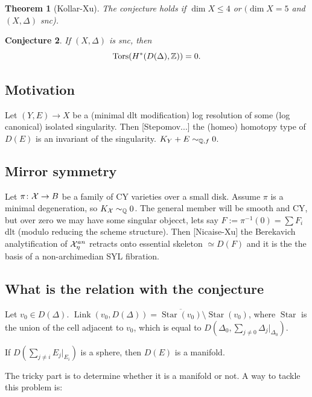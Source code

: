 \documentclass[A4paper, british, reqno]{amsart}
\theoremstyle{darkgreentheorem}
\newtheorem{thm}{Theorem}[section]
\newtheorem{conj}[thm]{Conjecture}
\theoremstyle{darkbluedefinition}
\theoremstyle{darkredexample}
\theoremstyle{remark}
\newcommand{\1}{\mathbbm{1}}
\begin{document}
\begin{thm}[Kollar-Xu]
    The conjecture holds if $\dim{X}\leqslant 4$ or $(\dim{X}=5$ and $(X,\Delta)$ snc).
\end{thm}

\begin{conj}
    If $(X,\Delta)$ is snc, then
    \[ \operatorname{Tors}(H^{*}(D(\Delta),\mathbb{Z}))=0. \]
\end{conj}

\subsection{Motivation}
Let $(Y,E)\to X$ be a (minimal dlt modification) log resolution of some (log canonical) isolated singularity.
Then [Stepomov...] the (homeo) homotopy type of $D(E)$ is an invariant of the singularity.
$K_{Y}+E\sim_{\mathbb{Q},f} 0 $.

\subsection{Mirror symmetry}
Let $\pi\colon \mathcal{X}\to B$ be a family of CY varieties over a small disk.
Assume $\pi$ is a minimal degeneration, so $K_{\mathcal{X}}\sim_{\mathbb{Q}} 0$.
The general member will be smooth and CY, but over zero we may have some singular objecct, lets say $F:=\pi^{-1}(0)=\sum F_{i}$ dlt (modulo reducing the scheme structure).
Then [Nicaise-Xu] the Berekavich analytification of $\mathcal{X}_{\eta}^{an}$ retracts onto essential skeleton $\simeq D(F)$ and it is the the basis of a non-archimedian SYL fibration.

\subsection{What is the relation with the conjecture}
Let $v_{0}\in D(\Delta)$.
$\operatorname{Link}(v_{0},D(\Delta))=\overline{\operatorname{Star}(v_{0})}\setminus \operatorname{Star}(v_{0})$, where $\operatorname{Star}$ is the union of the cell adjacent to $v_{0}$, which is equal to $D(\Delta_{0},\sum_{j\neq 0}\Delta_{j}|_{\Delta_{0}})$.

If $D(\sum_{j\neq i}E_{j}|_{E_{i}})$ is a sphere, then $D(E)$ is a manifold.

The tricky part is to determine whether it is a manifold or not.
A way to tackle this problem is:
\end{document}
